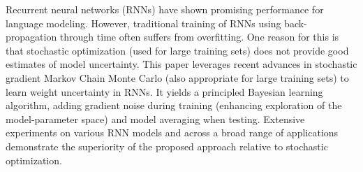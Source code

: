 Recurrent neural networks (RNNs) have shown promising performance for language modeling. However, traditional training of RNNs using back-propagation through time often suffers from overfitting. One reason for this is that stochastic optimization (used for large training sets) does not provide good estimates of model uncertainty. This paper leverages recent advances in stochastic gradient Markov Chain Monte Carlo (also appropriate for large training sets) to learn weight uncertainty in RNNs. It yields a principled Bayesian learning algorithm, adding gradient noise during training (enhancing exploration of the model-parameter space) and model averaging when testing. Extensive experiments on various RNN models and across a broad range of applications demonstrate the superiority of the proposed approach relative to stochastic optimization.
